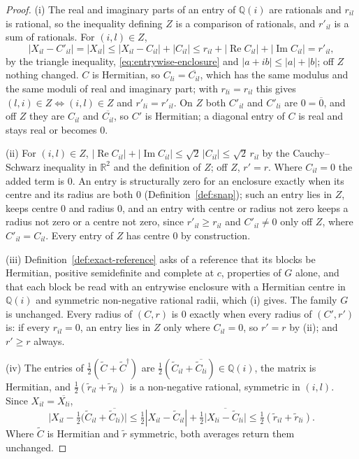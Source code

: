 \begin{proof}
(i) The real and imaginary parts of an entry of $\mathbb{Q}(i)$ are rationals
and $r_{il}$ is rational, so the inequality defining $Z$ is a comparison of
rationals, and $r'_{il}$ is a sum of rationals. For $(i,l)\in Z$,
\begin{equation*}
  |X_{il}-C'_{il}|=|X_{il}|\le|X_{il}-C_{il}|+|C_{il}|
  \le r_{il}+|\operatorname{Re}C_{il}|+|\operatorname{Im}C_{il}|=r'_{il},
\end{equation*}
by the triangle inequality, \eqref{eq:entrywise-enclosure} and
$|a+ib|\le|a|+|b|$; off $Z$ nothing changed. $C$ is Hermitian, so
$C_{li}=\overline{C_{il}}$, which has the same modulus and the same moduli of
real and imaginary part; with $r_{li}=r_{il}$ this gives
$(l,i)\in Z\iff(i,l)\in Z$ and $r'_{li}=r'_{il}$. On $Z$ both $C'_{il}$ and
$C'_{li}$ are $0=\overline{0}$, and off $Z$ they are $C_{il}$ and
$\overline{C_{il}}$, so $C'$ is Hermitian; a diagonal entry of $C$ is real
and stays real or becomes $0$.

(ii) For $(i,l)\in Z$, $|\operatorname{Re}C_{il}|+|\operatorname{Im}C_{il}|
\le\sqrt2\,|C_{il}|\le\sqrt2\,r_{il}$ by the Cauchy--Schwarz inequality in
$\mathbb{R}^{2}$ and the definition of $Z$; off $Z$, $r'=r$. Where
$C_{il}=0$ the added term is $0$. An entry is structurally zero for an
enclosure exactly when its centre and its radius are both $0$
(Definition~\ref{def:snap}); such an entry lies in $Z$, keeps centre $0$ and
radius $0$, and an entry with centre or radius not zero keeps a radius not
zero or a centre not zero, since $r'_{il}\ge r_{il}$ and $C'_{il}\neq0$ only
off $Z$, where $C'_{il}=C_{il}$. Every entry of $Z$ has centre $0$ by
construction.

(iii) Definition~\ref{def:exact-reference} asks of a reference that its
blocks be Hermitian, positive semidefinite and complete at $c$, properties of
$G$ alone, and that each block be read with an entrywise enclosure with a
Hermitian centre in $\mathbb{Q}(i)$ and symmetric non-negative rational radii,
which (i) gives. The family $G$ is unchanged. Every radius of $(C,r)$ is $0$
exactly when every radius of $(C',r')$ is: if every $r_{il}=0$, an entry lies
in $Z$ only where $C_{il}=0$, so $r'=r$ by (ii); and $r'\ge r$ always.

(iv) The entries of $\tfrac12(\tilde C+\tilde C^{\dagger})$ are
$\tfrac12(\tilde C_{il}+\overline{\tilde C_{li}})\in\mathbb{Q}(i)$, the
matrix is Hermitian, and $\tfrac12(\tilde r_{il}+\tilde r_{li})$ is a
non-negative rational, symmetric in $(i,l)$. Since $X_{il}=\overline{X_{li}}$,
\begin{equation*}
  \Big|X_{il}-\tfrac12\big(\tilde C_{il}+\overline{\tilde C_{li}}\big)\Big|
  \le\tfrac12|X_{il}-\tilde C_{il}|+\tfrac12\big|\overline{X_{li}-\tilde C_{li}}\big|
  \le\tfrac12(\tilde r_{il}+\tilde r_{li}).
\end{equation*}
Where $\tilde C$ is Hermitian and $\tilde r$ symmetric, both averages return
them unchanged.
\end{proof}
